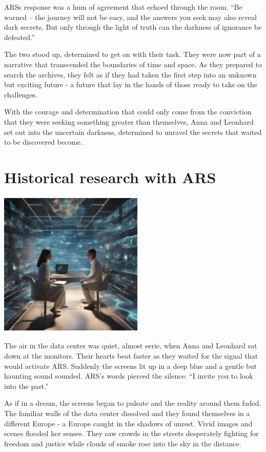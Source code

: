 \documentclass[
]{article}
\begin{document}
ARS\textquotesingle s response was a hum of agreement that echoed
through the room. ``Be warned -- the journey will not be easy, and the
answers you seek may also reveal dark secrets. But only through the
light of truth can the darkness of ignorance be defeated.''

The two stood up, determined to get on with their task. They were now
part of a narrative that transcended the boundaries of time and space.
As they prepared to search the archives, they felt as if they had taken
the first step into an unknown but exciting future - a future that lay
in the hands of those ready to take on the challenges.

With the courage and determination that could only come from the
conviction that they were seeking something greater than themselves,
Anna and Leonhard set out into the uncertain darkness, determined to
unravel the secrets that waited to be discovered become.

\section{Historical research with
ARS}\label{historical-research-with-ars}

\includegraphics[width=2.70833in,height=2.72917in]{media/image0005.png}

The air in the data center was quiet, almost eerie, when Anna and
Leonhard sat down at the monitors. Their hearts beat faster as they
waited for the signal that would activate ARS. Suddenly the screens lit
up in a deep blue and a gentle but haunting sound sounded. ARS's words
pierced the silence: ``I invite you to look into the past.''

As if in a dream, the screens began to pulsate and the reality around
them faded. The familiar walls of the data center dissolved and they
found themselves in a different Europe - a Europe caught in the shadows
of unrest. Vivid images and scenes flooded her senses. They saw crowds
in the streets desperately fighting for freedom and justice while clouds
of smoke rose into the sky in the distance.
\end{document}

